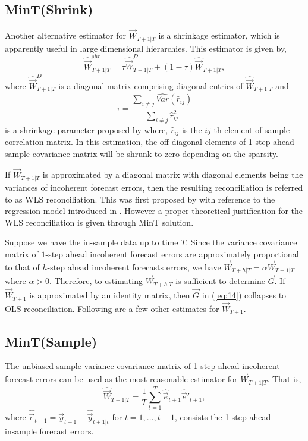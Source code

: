 \documentclass[graybox]{svmult}
\begin{document}
\subsection*{MinT(Shrink)}

Another alternative estimator for ${\vec{W}}_{T+1|T}$ is a shrinkage estimator, which is apparently useful in large dimensional hierarchies. This estimator is given by,
\begin{equation} \label{eq:16}
\hat{{\vec{W}}}_{T+1|T}^{shr} = \tau\hat{{\vec{W}}}_{T+1|T}^D + (1-\tau)\hat{{\vec{W}}}_{T+1|T},
\end{equation}
where $\hat{{\vec{W}}}_{T+1|T}^D$ is a diagonal matrix comprising diagonal entries of $\hat{{\vec{W}}}_{T+1|T}$ and
$$\tau = \frac{\sum_{i \ne j}\hat{Var}(\hat{r}_{ij})}{\sum_{i \ne j}\hat{r}_{ij}^2}$$ is a shrinkage parameter proposed by \citet{schafer2005} where, $\hat{r}_{ij}$ is the $ij$-th element of sample correlation matrix.  In this estimation, the off-diagonal elements of 1-step ahead sample covariance matrix will be shrunk to zero depending on the sparsity.



If ${\vec{W}}_{T+1|T}$ is approximated by a diagonal matrix with diagonal elements being the variances of incoherent forecast errors, then the resulting reconciliation is referred to as WLS reconciliation. This was first proposed by \cite{Hyndman2016} with reference to the regression model introduced in \cite{HynEtAl2011}. However a proper theoretical justification for the WLS reconciliation is given through MinT solution.


Suppose we have the in-sample data up to time $T$. Since the variance covariance matrix of $1$-step ahead incoherent forecast errors are approximately proportional to that of $h$-step ahead incoherent forecasts errors, we have $\vec{W}_{T+h|T} = \alpha\vec{W}_{T+1|T}$ where $\alpha>0$. Therefore, to estimating ${\vec{W}}_{T+h|T}$ is sufficient to determine $\vec{G}$. If ${\vec{W}}_{T+1}$ is approximated by an identity matrix, then $\vec{G}$ in (\ref{eq:14}) collapses to OLS reconciliation. Following are a few other estimates for ${\vec{W}}_{T+1}$.

\subsection*{MinT(Sample)}

The unbiased sample variance covariance matrix of 1-step ahead incoherent forecast errors can be used as the most reasonable estimator for ${\vec{W}}_{T+1|T}$. That is,
\begin{equation}\label{eq:15}
\hat{\vec{W}}_{T+1|T} = \frac{1}{T}\sum_{t=1}^{T}\hat{\vec{e}}_{t+1}\hat{\vec{e}}'_{t+1},
\end{equation}
where $\hat{\vec{e}}_{t+1} = \vec{y}_{t+1}-\hat{\vec{y}}_{t+1|t}$ for $t=1,...,t-1$,  consists the 1-step ahead insample forecast errors.
\end{document}
